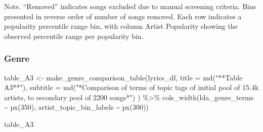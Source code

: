 \documentclass[
  man]{apa7}
\newenvironment{Shaded}{\begin{snugshade}}{\end{snugshade}}
\newcommand{\AttributeTok}[1]{\textcolor[rgb]{0.40,0.45,0.13}{#1}}
\newcommand{\DecValTok}[1]{\textcolor[rgb]{0.68,0.00,0.00}{#1}}
\newcommand{\FunctionTok}[1]{\textcolor[rgb]{0.28,0.35,0.67}{#1}}
\newcommand{\NormalTok}[1]{\textcolor[rgb]{0.00,0.23,0.31}{#1}}
\newcommand{\OtherTok}[1]{\textcolor[rgb]{0.00,0.23,0.31}{#1}}
\newcommand{\SpecialCharTok}[1]{\textcolor[rgb]{0.37,0.37,0.37}{#1}}
\newcommand{\StringTok}[1]{\textcolor[rgb]{0.13,0.47,0.30}{#1}}
\begin{document}
{Note. ``Removed'' indicates songs excluded due to manual screening
criteria. Bins presented in reverse order of number of songs removed.
Each row indicates a popularity percentile range bin, with column Artist
Popularity showing the observed percentile range per popularity bin.}

\subsubsection{Genre}\label{genre}

\begin{Shaded}
\begin{Highlighting}[]
\NormalTok{table\_A3 }\OtherTok{\textless{}{-}} \FunctionTok{make\_genre\_comparison\_table}\NormalTok{(lyrics\_df,}
  \AttributeTok{title =} \FunctionTok{md}\NormalTok{(}\StringTok{"**Table A3**"}\NormalTok{),}
  \AttributeTok{subtitle =} \FunctionTok{md}\NormalTok{(}\StringTok{"*Comparison of terms of topic tags of initial pool of 15.4k artists, to secondary pool of 2200 songs*"}\NormalTok{)}
\NormalTok{)  }\SpecialCharTok{\%\textgreater{}\%}
  \FunctionTok{cols\_width}\NormalTok{(lda\_genre\_terms }\SpecialCharTok{\textasciitilde{}} \FunctionTok{px}\NormalTok{(}\DecValTok{350}\NormalTok{), artist\_topic\_bin\_labels }\SpecialCharTok{\textasciitilde{}} \FunctionTok{px}\NormalTok{(}\DecValTok{300}\NormalTok{))}


\NormalTok{table\_A3}
\end{Highlighting}
\end{Shaded}
\end{document}
